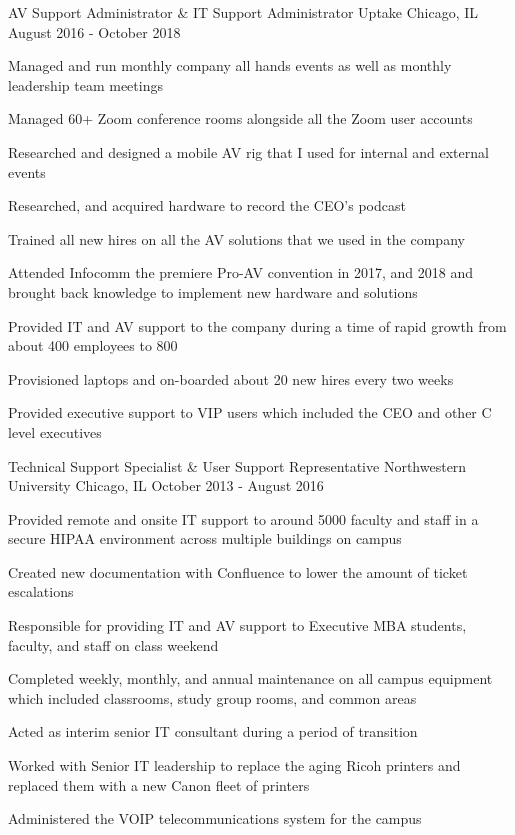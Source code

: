 \begin{cventries}
	\cventry
	{AV Support Administrator \& IT Support Administrator} %
	{Uptake} %
	{Chicago, IL} %
	{August 2016 - October 2018} %
	{
		\begin{cvitems} %
			\item {Managed and run monthly company all hands events as well as monthly leadership team meetings}
			\item {Managed 60+ Zoom conference rooms alongside all the Zoom user accounts}
			\item {Researched and designed a mobile AV rig that I used for internal and external events}
			\item {Researched, and acquired hardware to record the CEO's podcast}
			\item {Trained all new hires on all the AV solutions that we used in the company}
			\item {Attended Infocomm the premiere Pro-AV convention in 2017, and 2018 and brought back knowledge to implement new hardware and solutions}
			\item {Provided IT and AV support to the company during a time of rapid growth from about 400 employees to 800}
			\item {Provisioned laptops and on-boarded about 20 new hires every two weeks}
			\item {Provided executive support to VIP users which included the CEO and other C level executives}
		\end{cvitems}
	}

	\cventry
	{Technical Support Specialist \& User Support Representative} %
	{Northwestern University} %
	{Chicago, IL} %
	{October 2013 - August 2016} %
	{
		\begin{cvitems} %
			\item {Provided remote and onsite IT support to around 5000 faculty and staff in a secure HIPAA environment across multiple buildings on campus}
			\item {Created new documentation with Confluence to lower the amount of ticket escalations}
			\item {Responsible for providing IT and AV support to Executive MBA students, faculty, and staff on class weekend}
			\item {Completed weekly, monthly, and annual maintenance on all campus equipment which included classrooms, study group rooms, and common areas}
			\item {Acted as interim senior IT consultant during a period of transition}
			\item {Worked with Senior IT leadership to replace the aging Ricoh printers and replaced them with a new Canon fleet of printers}
			\item {Administered the VOIP telecommunications system for the campus}
		\end{cvitems}
	}

\end{cventries}
